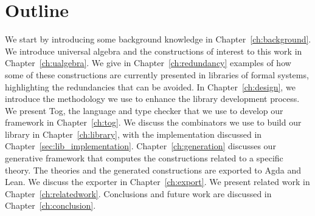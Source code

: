 \section{Outline}
We start by introducing some background knowledge in Chapter~\ref{ch:background}. 
We introduce universal algebra and the constructions of interest to this work in Chapter~\ref{ch:ualgebra}. 
We give in Chapter~\ref{ch:redundancy} examples of how some of these constructions are currently presented in libraries of formal systems, highlighting the redundancies that can be avoided.
In Chapter~\ref{ch:design}, we introduce the methodology we use to enhance the library development process. 
We present Tog, the language and type checker that we use to develop our framework in Chapter~\ref{ch:tog}. 
We discuss the combinators we use to build our library in Chapter~\ref{ch:library}, with the implementation discussed in Chapter~\ref{sec:lib_implementation}. 
Chapter~\ref{ch:generation} discusses our generative framework that computes the constructions related to a specific theory.  
The theories and the generated constructions are exported to Agda and Lean. We discuss the exporter in Chapter~\ref{ch:export}. 
We present related work in Chapter~\ref{ch:relatedwork}. Conclusions and future work are discussed in Chapter~\ref{ch:conclusion}. 


